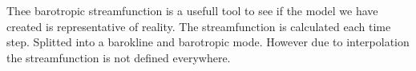 Thee barotropic streamfunction is a usefull tool to see if the model we have created is representative of reality. The streamfunction is calculated each time  step. Splitted into a barokline and barotropic mode. However due to interpolation the streamfunction is not defined everywhere.